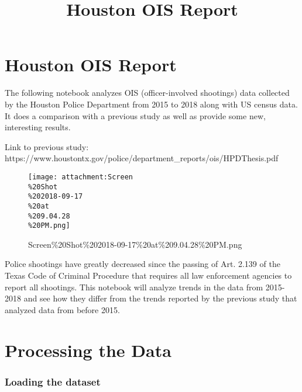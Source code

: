 \documentclass[11pt]{article}
\title{Houston OIS Report}
\makeatletter
\def\maxwidth{\ifdim\Gin@nat@width>\linewidth\linewidth
    \else\Gin@nat@width\fi}
\let\Oldincludegraphics\includegraphics
\renewcommand{\includegraphics}[1]{\Oldincludegraphics[width=.8\maxwidth]{#1}}
\makeatother
\begin{document}
    
    
    \maketitle
    
    

    
    \section{Houston OIS Report}\label{houston-ois-report}

The following notebook analyzes OIS (officer-involved shootings) data
collected by the Houston Police Department from 2015 to 2018 along with
US census data. It does a comparison with a previous study as well as
provide some new, interesting results.

Link to previous study:
https://www.houstontx.gov/police/department\_reports/ois/HPDThesis.pdf

    \begin{figure}
\centering
\texttt{[image: attachment:Screen\\\%20Shot\\\%202018-09-17\\\%20at\\\%209.04.28\\\%20PM.png]}
\caption{Screen\%20Shot\%202018-09-17\%20at\%209.04.28\%20PM.png}
\end{figure}

    Police shootings have greatly decreased since the passing of Art. 2.139
of the Texas Code of Criminal Procedure that requires all law
enforcement agencies to report all shootings. This notebook will analyze
trends in the data from 2015-2018 and see how they differ from the
trends reported by the previous study that analyzed data from before
2015.

    \section{Processing the Data}\label{processing-the-data}

    \subsubsection{Loading the dataset}\label{loading-the-dataset}
\end{document}
